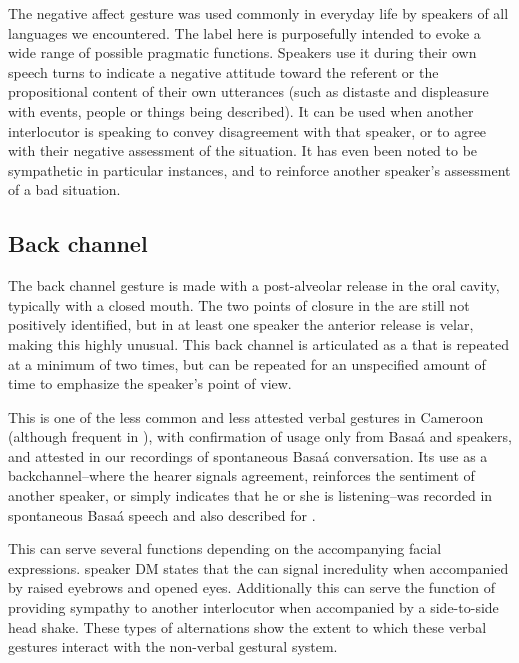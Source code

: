 \documentclass[output=paper
,newtxmath
,modfonts
,nonflat]{langsci/langscibook}
\begin{document}


The negative affect gesture was used commonly in everyday life by speakers of all languages we encountered. The label here is purposefully intended to evoke a wide range of possible pragmatic functions. Speakers use it during their own speech turns to indicate a negative attitude toward the referent or the propositional content of their own utterances (such as distaste and displeasure with events, people or things being described). It can be used when another interlocutor is speaking to convey disagreement with that speaker, or to agree with their negative assessment of the situation. It has even been noted to be sympathetic in particular instances, and to reinforce another speaker's assessment of a bad situation. %

\subsection{Back channel}

The back channel gesture is made with a post-alveolar release in the oral cavity, typically with a closed mouth. The two points of closure in the  are still not positively identified, but in at least one speaker the anterior release is velar, making this  highly unusual. This back channel is articulated as a  that is repeated at a minimum of two times, but can be repeated for an unspecified amount of time to emphasize the speaker's point of view. 

This is one of the less common and less attested verbal gestures in Cameroon (although frequent in ), with confirmation of usage only from Basa\'a and  speakers, and attested in our recordings of spontaneous Basa\'{a} conversation. Its use as a backchannel--where the hearer signals agreement, reinforces the sentiment of another speaker, or simply indicates that he or she is listening--was recorded in spontaneous Basa\'{a} speech and also described for .

This  can serve several functions depending on the accompanying facial expressions.  speaker DM  states that the  can signal incredulity when accompanied by raised eyebrows and opened eyes. Additionally this  can serve the function of providing sympathy to another interlocutor when accompanied by a side-to-side head shake. These types of alternations show the extent to which these verbal gestures interact with the non-verbal gestural system. 
\end{document}

